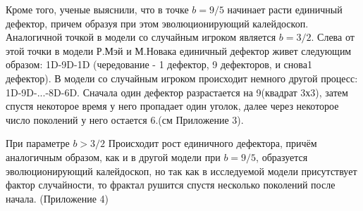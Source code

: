 \documentclass[12pt,a4paper]{article}
\begin{document}
	\par Кроме того, ученые выяснили, что в точке $b=9/5$ начинает расти единичный дефектор, причем образуя при этом эволюционирующий калейдоскоп. Аналогичной точкой в модели со случайным игроком является $b=3/2$. Слева от этой точки в модели Р.Мэй и М.Новака единичный дефектор живет следующим образом: 1D-9D-1D (чередование - 1 дефектор, 9 дефекторов, и снова1 дефектор). В модели со случайным игроком происходит немного другой процесс: 1D-9D-...-8D-6D. Сначала один дефектор разрастается на 9(квадрат 3х3), затем спустя некоторое время у него пропадает один уголок, далее через некоторое число поколений у него остается 6.(см Приложение 3).
	
	\par При параметре $b>3/2$ Происходит рост единичного дефектора, причём аналогичным образом, как и в другой модели при $b=9/5$, образуется эволюционирующий калейдоскоп, но так как в исследуемой модели присутствует фактор случайности, то фрактал рушится спустя несколько поколений после начала. (Приложение 4)
\end{document}
